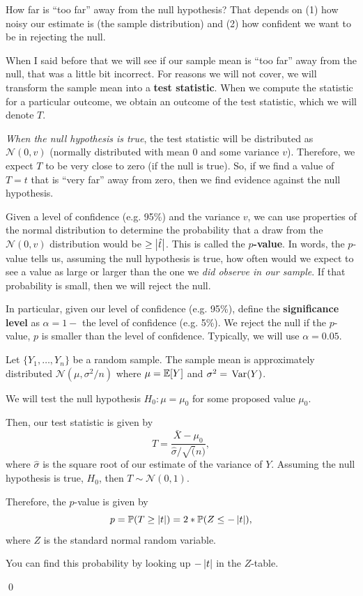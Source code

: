 \documentclass[12pt]{article}
\begin{document}
How far is ``too far'' away from the null hypothesis? That depends on (1) how noisy our estimate is (the sample distribution) and (2) how confident we want to be in rejecting the null.

When I said before that we will see if our sample mean is ``too far'' away from the null, that was a little bit incorrect. For reasons we will not cover, we will transform the sample mean into a \textbf{test statistic}. When we compute the statistic for a particular outcome, we obtain an outcome of the test statistic, which we will denote $T$.

\emph{When the null hypothesis is true}, the test statistic will be distributed as $\mathcal{N}(0, v)$ (normally distributed with mean $0$ and some variance $v$). Therefore, we expect $T$ to be very close to zero (if the null is true). So, if we find a value of $T = t$ that is ``very far'' away from zero, then we find evidence against the null hypothesis.

Given a level of confidence (e.g. 95\%) and the variance $v$, we can use properties of the normal distribution to determine the probability that a draw from the $\mathcal{N}(0, v)$ distribution would be $\geq \left\lvert \hat{t} \right\rvert$. This is called the \textbf{$p$-value}. In words, the $p$-value tells us, assuming the null hypothesis is true, how often would we expect to see a value as large or larger than the one we \emph{did observe in our sample}. If that probability is small, then we will reject the null.

In particular, given our level of confidence (e.g. 95\%), define the \textbf{significance level} as $\alpha = 1 -$ the level of confidence (e.g. 5\%). We reject the null if the $p$-value, $p$ is smaller than the level of confidence. Typically, we will use $\alpha = 0.05$.

\begin{example}
  Let $\{ Y_1, \dots, Y_n \}$ be a random sample. The sample mean is approximately distributed $\mathcal{N}(\mu, \sigma^2 / n)$ where $\mu = \expec{Y}$ and $\sigma^2 = \var{Y}$.

  We will test the null hypothesis $H_0: \mu = \mu_0$ for some proposed value $\mu_0$.

  Then, our test statistic is given by
  $$
    T = \frac{\bar{X} - \mu_0}{\hat{\sigma} / \sqrt(n)},
  $$
  where $\hat{\sigma}$ is the square root of our estimate of the variance of $Y$. Assuming the null hypothesis is true, $H_0$, then $T \sim \mathcal{N}(0, 1)$.

  Therefore, the $p$-value is given by
  $$
    p = \prob{T \geq \abs{t}} = 2 * \prob{Z \leq -\abs{t}},
  $$
  where $Z$ is the standard normal random variable.

  You can find this probability by looking up $-\left\lvert t \right\rvert$ in the $Z$-table.

  \qed
\end{example}
\end{document}
